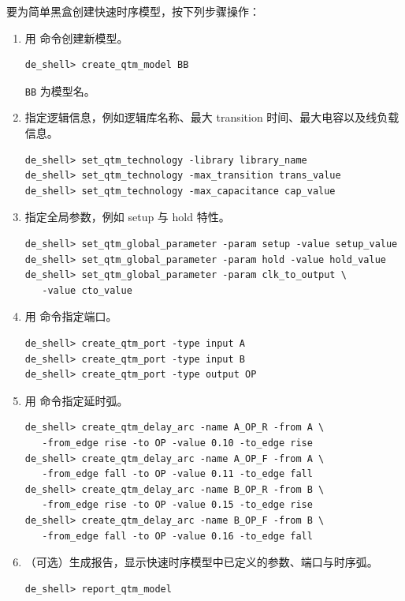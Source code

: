 要为简单黑盒创建快速时序模型，按下列步骤操作：
\begin{enumerate}
  \item 用  命令创建新模型。
\begin{lstlisting}
de_shell> create_qtm_model BB
\end{lstlisting}
        \texttt{BB} 为模型名。

  \item 指定逻辑信息，例如逻辑库名称、最大 transition 时间、最大电容以及线负载信息。
\begin{lstlisting}
de_shell> set_qtm_technology -library library_name
de_shell> set_qtm_technology -max_transition trans_value
de_shell> set_qtm_technology -max_capacitance cap_value
\end{lstlisting}

  \item 指定全局参数，例如 setup 与 hold 特性。
\begin{lstlisting}
de_shell> set_qtm_global_parameter -param setup -value setup_value
de_shell> set_qtm_global_parameter -param hold -value hold_value
de_shell> set_qtm_global_parameter -param clk_to_output \
   -value cto_value
\end{lstlisting}

  \item 用  命令指定端口。
\begin{lstlisting}
de_shell> create_qtm_port -type input A
de_shell> create_qtm_port -type input B
de_shell> create_qtm_port -type output OP
\end{lstlisting}

  \item 用  命令指定延时弧。
\begin{lstlisting}
de_shell> create_qtm_delay_arc -name A_OP_R -from A \
   -from_edge rise -to OP -value 0.10 -to_edge rise
de_shell> create_qtm_delay_arc -name A_OP_F -from A \
   -from_edge fall -to OP -value 0.11 -to_edge fall
de_shell> create_qtm_delay_arc -name B_OP_R -from B \
   -from_edge rise -to OP -value 0.15 -to_edge rise
de_shell> create_qtm_delay_arc -name B_OP_F -from B \
   -from_edge fall -to OP -value 0.16 -to_edge fall
\end{lstlisting}

  \item （可选）生成报告，显示快速时序模型中已定义的参数、端口与时序弧。
\begin{lstlisting}
de_shell> report_qtm_model
\end{lstlisting}


\end{enumerate}

